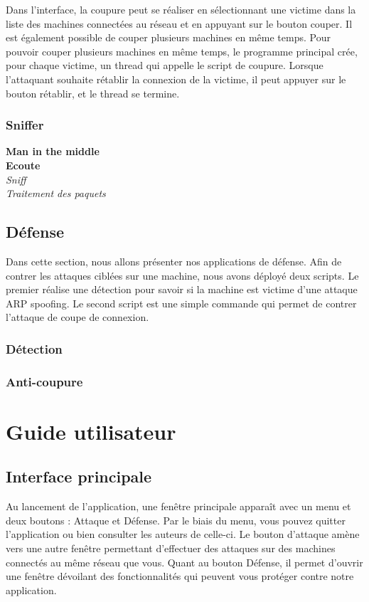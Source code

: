 \documentclass[11pt]{article}
\begin{document}
Dans l'interface, la coupure peut se réaliser en sélectionnant une victime dans la liste des machines connectées au réseau et en appuyant sur le bouton couper. Il est également possible de couper plusieurs machines en même temps. Pour pouvoir couper plusieurs machines en même temps, le programme principal crée, pour chaque victime, un thread qui appelle le script de coupure. Lorsque l'attaquant souhaite rétablir la connexion de la victime, il peut appuyer sur le bouton rétablir, et le thread se termine.

\subsubsection{Sniffer}

\textbf{Man in the middle}~\\

\textbf{Ecoute}~\\
\textit{Sniff}~\\

\textit{Traitement des paquets}~\\



\subsection{Défense}
Dans cette section, nous allons présenter nos applications de défense.
Afin de contrer les attaques ciblées sur une machine, nous avons déployé deux scripts. Le premier réalise une détection pour savoir si la machine est victime d'une attaque ARP spoofing. Le second script est une simple commande qui permet de contrer l'attaque de coupe de connexion.
\subsubsection{Détection}
\subsubsection{Anti-coupure}

\section{Guide utilisateur}
\subsection{Interface principale}
Au lancement de l'application, une fenêtre principale apparaît avec un menu et deux boutons : Attaque et Défense. Par le biais du menu, vous pouvez quitter l'application ou bien consulter les auteurs de celle-ci. Le bouton d'attaque amène vers une autre fenêtre permettant d'effectuer des attaques sur des machines connectés au même réseau que vous. Quant au bouton Défense, il permet d'ouvrir une fenêtre dévoilant des fonctionnalités qui peuvent vous protéger contre notre application.
\end{document}
